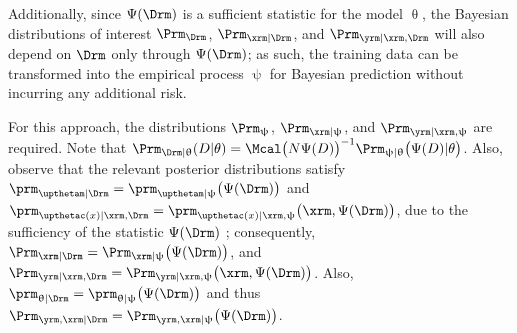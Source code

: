 \documentclass[12pt]{report}
\begin{document}
Additionally, since $\Psi(\Drm)$ is a sufficient statistic for the model $\uptheta$, the Bayesian distributions of interest $\Prm_{\Drm}$, $\Prm_{\xrm | \Drm}$, and $\Prm_{\yrm | \xrm,\Drm}$ will also depend on $\Drm$ only through $\Psi(\Drm)$; as such, the training data can be transformed into the empirical process $\uppsi$ for Bayesian prediction without incurring any additional risk. 

For this approach, the distributions $\Prm_{\uppsi}$, $\Prm_{\xrm | \uppsi}$, and $\Prm_{\yrm | \xrm,\uppsi}$ are required. Note that $\Prm_{\Drm | \uptheta}(D | \theta) = \Mcal\big( N \Psi(D) \big)^{-1} \Prm_{\uppsi | \uptheta}\big( \Psi(D) | \theta \big)$. Also, observe that the relevant posterior distributions satisfy $\prm_{\upthetam | \Drm} = \prm_{\upthetam | \uppsi}\big( \Psi(\Drm) \big)$ and $\prm_{\upthetac(x) | \xrm,\Drm} = \prm_{\upthetac(x) | \xrm,\uppsi}\big( \xrm,\Psi(\Drm) \big)$, due to the sufficiency of the statistic $\Psi(\Drm)$ \cite{bernardo}; consequently, $\Prm_{\xrm | \Drm} = \Prm_{\xrm | \uppsi}\big( \Psi(\Drm) \big)$, and $\Prm_{\yrm | \xrm,\Drm} = \Prm_{\yrm | \xrm,\uppsi}\big( \xrm,\Psi(\Drm) \big)$. Also, $\prm_{\uptheta | \Drm} = \prm_{\uptheta | \uppsi}\big( \Psi(\Drm) \big)$ and thus $\Prm_{\yrm, \xrm| \Drm} = \Prm_{\yrm, \xrm| \uppsi}\big( \Psi(\Drm) \big)$.
\end{document}
